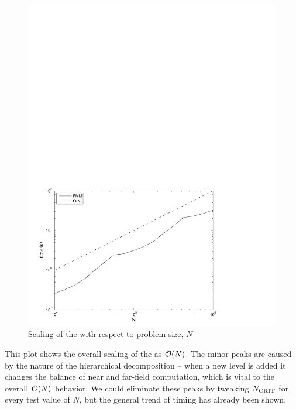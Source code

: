 \begin{figure}[h]
\begin{center}
	\includegraphics[width=14cm]{img/FMMScaling.pdf}
	\caption{Scaling of the {\fmm} with respect to problem size, $N$}
	\label{fig:fmm_scaling}
\end{center}
\end{figure}

This plot shows the overall scaling of the {\fmm} as $\mathcal{O}(N)$. The minor peaks are caused by the nature of the hierarchical decomposition -- when a new level is added it changes the balance of near and far-field computation, which is vital to the overall $\mathcal{O}(N)$ behavior. We could eliminate these peaks by tweaking $N_{\text{CRIT}}$ for every test value of $N$, but the general trend of timing has already been shown.
